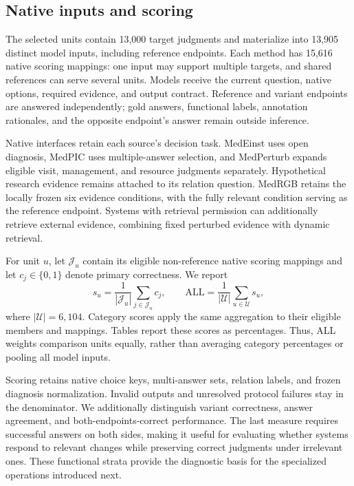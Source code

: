 \subsection{Native inputs and scoring}

The selected units contain 13,000 target judgments and materialize into 13,905 distinct model inputs, including reference endpoints. Each method has 15,616 native scoring mappings: one input may support multiple targets, and shared references can serve several units. Models receive the current question, native options, required evidence, and output contract. Reference and variant endpoints are answered independently; gold answers, functional labels, annotation rationales, and the opposite endpoint's answer remain outside inference.

Native interfaces retain each source's decision task. MedEinst uses open diagnosis, MedPIC uses multiple-answer selection, and MedPerturb expands eligible visit, management, and resource judgments separately. Hypothetical research evidence remains attached to its relation question. MedRGB retains the locally frozen six evidence conditions, with the fully relevant condition serving as the reference endpoint. Systems with retrieval permission can additionally retrieve external evidence, combining fixed perturbed evidence with dynamic retrieval.

For unit $u$, let $\mathcal{J}_u$ contain its eligible non-reference native scoring mappings and let $c_j\in\{0,1\}$ denote primary correctness. We report
\begin{equation}
 s_u=\frac{1}{|\mathcal{J}_u|}\sum_{j\in\mathcal{J}_u}c_j,
 \qquad
 \mathrm{ALL}=\frac{1}{|\mathcal{U}|}\sum_{u\in\mathcal{U}}s_u,
 \label{eq:native-score}
\end{equation}
where $|\mathcal{U}|=6{,}104$. Category scores apply the same aggregation to their eligible members and mappings. Tables report these scores as percentages. Thus, ALL weights comparison units equally, rather than averaging category percentages or pooling all model inputs.

Scoring retains native choice keys, multi-answer sets, relation labels, and frozen diagnosis normalization. Invalid outputs and unresolved protocol failures stay in the denominator. We additionally distinguish variant correctness, answer agreement, and both-endpoints-correct performance. The last measure requires successful answers on both sides, making it useful for evaluating whether systems respond to relevant changes while preserving correct judgments under irrelevant ones. These functional strata provide the diagnostic basis for the specialized operations introduced next.
